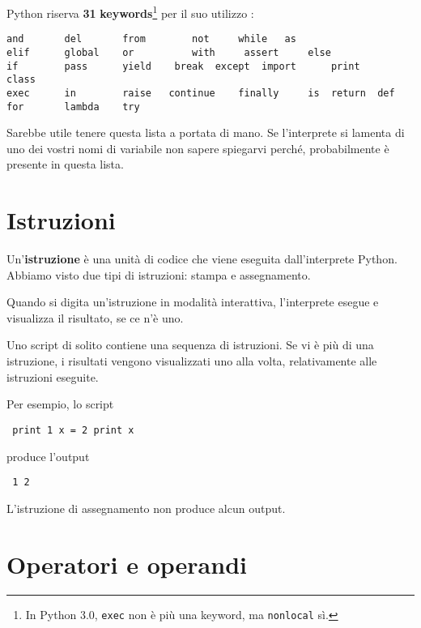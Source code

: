  

Python riserva \textbf{31} \textbf{keywords}\footnote{	 In Python
3.0, {\tt exec} non \`{e} pi\`{u} una  keyword, ma  {\tt nonlocal}
s\`{i}.} \textbf{ }per il suo utilizzo :

\beforeverb \begin{verbatim} 
and       del       from	 	not	 	while 	as        
elif      global    or	 	 	with 	 assert 	else     
if        pass      yield 	 break	except 	import   	print		class    
exec      in        raise  	continue  	finally 	is	return	def      
for       lambda    try \end{verbatim} \afterverb
%
Sarebbe utile tenere questa lista a portata di mano. Se l'interprete si
lamenta di uno dei vostri nomi di variabile non sapere spiegarvi
perch\'{e}, probabilmente \`{e} presente in questa lista.

\section{Istruzioni}

Un'\textbf{istruzione }\`{e} una unit\`{a} di codice che viene eseguita
dall'interprete Python. Abbiamo visto due tipi di istruzioni: stampa e
assegnamento.

  

Quando si digita un'istruzione in modalit\`{a} interattiva, l'interprete
esegue e visualizza il risultato, se ce n'\`{e} uno.

Uno script di solito contiene una sequenza di istruzioni. Se vi \`{e}
pi\`{u} di una istruzione, i risultati vengono visualizzati uno alla
volta, relativamente alle istruzioni eseguite.


Per esempio, lo script

\beforeverb \begin{verbatim} print 1 x = 2 print x \end{verbatim}
\afterverb
%
produce l'output

\beforeverb \begin{verbatim} 1 2 \end{verbatim} \afterverb
%
L'istruzione di assegnamento non produce alcun output.


\section{Operatori e operandi} 
  

